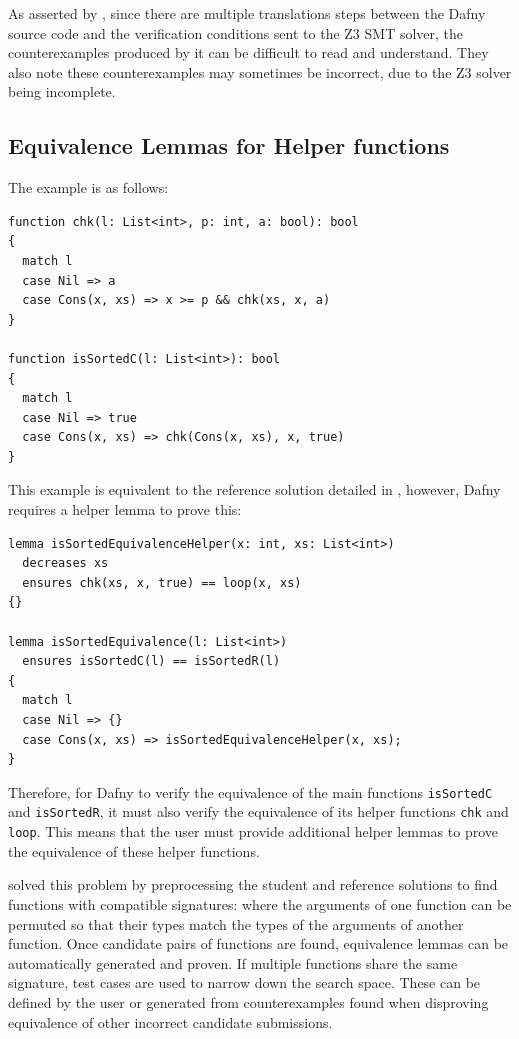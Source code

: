 \documentclass[a4paper, 11pt]{article}
\begin{document}
As asserted by \textcite{putrueleMaskDToolMeasuring2022}, since there are multiple translations steps between the Dafny source code and the verification conditions sent to the Z3 SMT solver, the counterexamples produced by it can be difficult to read and understand. They also note these counterexamples may sometimes be incorrect, due to the Z3 solver being incomplete.

\subsection{Equivalence Lemmas for Helper functions}

The example is as follows:
\begin{lstlisting}[caption=\lstinline|isSortedC| Function]
function chk(l: List<int>, p: int, a: bool): bool
{
  match l
  case Nil => a
  case Cons(x, xs) => x >= p && chk(xs, x, a)
}

function isSortedC(l: List<int>): bool
{
  match l
  case Nil => true
  case Cons(x, xs) => chk(Cons(x, xs), x, true)
}
\end{lstlisting}
%
This example is equivalent to the reference solution detailed in , however, Dafny requires a helper lemma to prove this:
\begin{lstlisting}[caption=Equivalence Lemma with Helper for \lstinline|isSortedC| and \lstinline|isSortedR|]
lemma isSortedEquivalenceHelper(x: int, xs: List<int>)
  decreases xs
  ensures chk(xs, x, true) == loop(x, xs)
{}

lemma isSortedEquivalence(l: List<int>)
  ensures isSortedC(l) == isSortedR(l)
{
  match l
  case Nil => {}
  case Cons(x, xs) => isSortedEquivalenceHelper(x, xs);
}
\end{lstlisting}
%
Therefore, for Dafny to verify the equivalence of the main functions \lstinline|isSortedC| and \lstinline|isSortedR|, it must also verify the equivalence of its helper functions \lstinline|chk| and \lstinline|loop|. This means that the user must provide additional helper lemmas to prove the equivalence of these helper functions. 

\textcite{milovancevicProvingDisprovingEquivalence2023} solved this problem by preprocessing the student and reference solutions to find functions with compatible signatures: where the arguments of one function can be permuted so that their types match the types of the arguments of another function. Once candidate pairs of functions are found, equivalence lemmas can be automatically generated and proven. If multiple functions share the same signature, test cases are used to narrow down the search space. These can be defined by the user or generated from counterexamples found when disproving equivalence of other incorrect candidate submissions.
\end{document}
